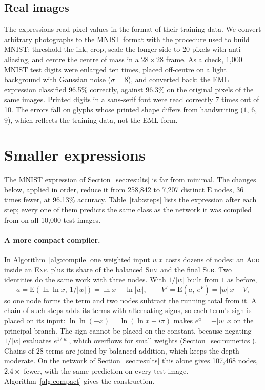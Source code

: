 \documentclass[11pt]{article}
\newcommand{\E}{\mathrm{E}}
\begin{document}
\subsection{Real images}
The expressions read pixel values in the format of their training data. We
convert arbitrary photographs to the MNIST format with the procedure used to
build MNIST: threshold the ink, crop, scale the longer side to 20 pixels with
anti-aliasing, and centre the centre of mass in a $28\times28$ frame. As a
check, 1{,}000 MNIST test digits were enlarged ten times, placed off-centre
on a light background with Gaussian noise ($\sigma=8$), and converted back:
the EML expression classified 96.5\% correctly, against 96.3\% on the
original pixels of the same images. Printed digits in a sans-serif font were
read correctly 7 times out of 10. The errors fall on glyphs whose printed
shape differs from handwriting ($1$, $6$, $9$), which reflects the training
data, not the EML form.

\section{Smaller expressions}
\label{sec:compress}

The MNIST expression of Section~\ref{sec:results} is far from minimal. The
changes below, applied in order, reduce it from 258{,}842 to 7{,}207 distinct
$\E$ nodes, 36 times fewer, at 96.13\% accuracy. Table~\ref{tab:steps} lists
the expression after each step; every one of them predicts the same class as
the network it was compiled from on all 10{,}000 test images.

\paragraph{A more compact compiler.}
In Algorithm~\ref{alg:compile} one weighted input $w\,x$ costs dozens of
nodes: an \textsc{Add} inside an \textsc{Exp}, plus its share of the balanced
\textsc{Sum} and the final \textsc{Sub}. Two identities do the same work with
three nodes. With $1/|w|$ built from $1$ as before,
\[
  a = \E\!\left(\ln\ln x,\ 1/|w|\right) = \ln x + \ln|w|,
  \qquad
  V' = \E\!\left(a,\ e^{V}\right) = |w|\,x - V ,
\]
so one node forms the term and two nodes subtract the running total from it.
A chain of such steps adds its terms with alternating signs, so each term's
sign is placed on its input: $\ln\ln(-x)=\ln(\ln x+i\pi)$ makes $e^{a}=-|w|\,x$
on the principal branch. The sign cannot be placed on the constant, because
negating $1/|w|$ evaluates $e^{1/|w|}$, which overflows for small weights
(Section~\ref{sec:numerics}). Chains of 28 terms are joined by balanced
addition, which keeps the depth moderate. On the network of
Section~\ref{sec:results} this alone gives 107{,}468 nodes, $2.4\times$ fewer,
with the same prediction on every test image.
Algorithm~\ref{alg:compact} gives the construction.
\end{document}
